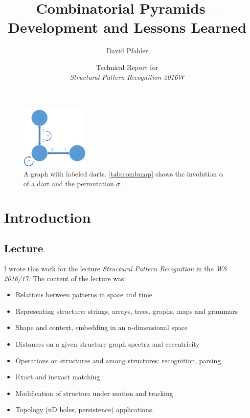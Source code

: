\documentclass[12pt]{article}
\title{Combinatorial Pyramids – Development and Lessons Learned}
\author{David Pfahler}
\date{Technical Report for \\ \emph{Structural Pattern Recognition 2016W}}
\newif\ifdebug
\begin{document}
\debugtrue

\maketitle

\begin{figure}[!htb]
  \centering
  \includegraphics[width=0.3\textwidth]{img/combmap.pdf}
  \caption{A graph with labeled darts. \cref{tab:combmap} shows the involution \( \alpha \) of a dart and the permutation \( \sigma \).}\label{fig:combmap}
\end{figure}

\section{Introduction} %
\label{sec:introduction}

\subsection{Lecture} %
\label{sub:lecture}

I wrote this work for the lecture \emph{Structural Pattern Recognition} in the \emph{WS 2016/17}. The content of the lecture was:
\begin{itemize}
  \item Relations between patterns in space and time
  \item Representing structure: strings, arrays, trees, graphs, maps and grammars
  \item Shape and context, embedding in an n-dimensional space
  \item Distances on a given structure graph spectra and eccentricity
  \item Operations on structures and among structures: recognition, parsing
  \item Exact and inexact matching
  \item Modification of structure under motion and tracking
  \item Topology (nD holes, persistence) applications.
\end{itemize}
\end{document}
